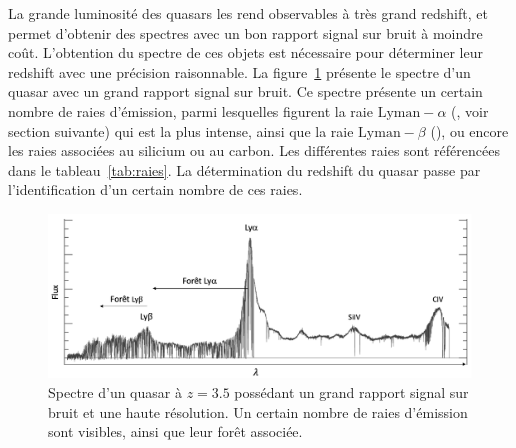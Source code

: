 \documentclass[11pt, twoside, a4paper, openright]{report}
\begin{document}
La grande luminosité des quasars les rend observables à très grand redshift, et permet d'obtenir des spectres avec un bon rapport signal sur bruit à moindre coût. L'obtention du spectre de ces objets est nécessaire pour déterminer leur redshift avec une précision raisonnable. La figure~\ref{fig:spectre_qso} présente le spectre d'un quasar avec un grand rapport signal sur bruit. Ce spectre présente un certain nombre de raies d'émission, parmi lesquelles figurent la raie $\mathrm{Lyman-}\alpha$ (\lya{}, voir section suivante) qui est la plus intense, ainsi que la raie $\mathrm{Lyman-}\beta$ (\lyb{}), ou encore les raies associées au silicium ou au carbon. Les différentes raies sont référencées dans le tableau~\ref{tab:raies}. La détermination du redshift du quasar passe par l'identification d'un certain nombre de ces raies.
\begin{figure}
  \centering
  \includegraphics[scale=0.4]{spectre_qso}
  \caption{Spectre d'un quasar à $z = 3.5$ possédant un grand rapport signal sur bruit et une haute résolution. Un certain nombre de raies d'émission sont visibles, ainsi que leur forêt associée.}
  \label{fig:spectre_qso}
\end{figure}
\end{document}
